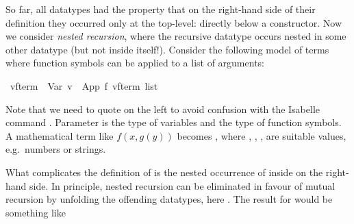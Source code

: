 %
\begin{isabellebody}%
\def\isabellecontext{Nested}%
%
\isadelimtheory
%
\endisadelimtheory
%
\isatagtheory
%
\endisatagtheory
{\isafoldtheory}%
%
\isadelimtheory
%
\endisadelimtheory
%
\begin{isamarkuptext}%
%
So far, all datatypes had the property that on the right-hand side of their
definition they occurred only at the top-level: directly below a
constructor. Now we consider \emph{nested recursion}, where the recursive
datatype occurs nested in some other datatype (but not inside itself!).
Consider the following model of terms
where function symbols can be applied to a list of arguments:%
\end{isamarkuptext}%
\isamarkuptrue%
\isamarkupfalse%
\ {}{}v{}{}f{}{}term{}\ {}\ Var\ {}v\ {}\ App\ {}f\ {}{}{}v{}{}f{}term\ list{}%
\begin{isamarkuptext}%
\noindent
Note that we need to quote  on the left to avoid confusion with
the Isabelle command .
Parameter  is the type of variables and  the type of
function symbols.
A mathematical term like $f(x,g(y))$ becomes , where , , ,  are
suitable values, e.g.\ numbers or strings.

What complicates the definition of  is the nested occurrence of
 inside  on the right-hand side. In principle,
nested recursion can be eliminated in favour of mutual recursion by unfolding
the offending datatypes, here . The result for 
would be something like
\medskip


\medskip


\end{isamarkuptext}
\end{isabellebody}
